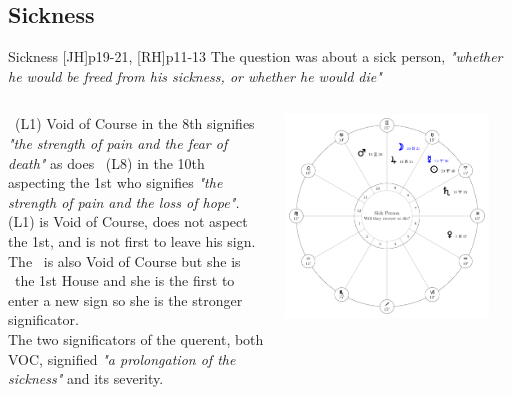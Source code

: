 \subsection{Sickness}
\begin{frame}[t]{Sickness [JH]p19-21, [RH]p11-13 }
The question was about a sick person, \textsl{"whether he would be freed from his sickness, or whether he would die"} \\
\vspace{0.25cm}
\begin{columns}[T, onlytextwidth]
\Mercury\ (L1)  Void of Course in the 8th signifies \textsl{"the strength of pain and the fear of death"} as does \Mars\ (L8) in the 10th aspecting the 1st who signifies \textsl{"the strength of pain and the loss of hope". } \\

\vspace{0.2cm}
\Mercury (L1) is Void of Course, does not aspect the 1st, and is not first to leave his sign. \\

\vspace{0.2cm}
The \Moon\ is also Void of Course but she is \Trine\ the 1st House and she is the first to enter a new sign so she is the stronger significator. \\

\vspace{0.2cm}
The two significators of the querent, both VOC, signified \textsl{"a prolongation of the sickness"} and its severity.\\


\begin{center}
\vspace{-0.75cm}
{\includegraphics[width=0.9\textwidth]{charts/21-chart-sickness}} \\
\end{center}
\end{columns}

\end{frame}
